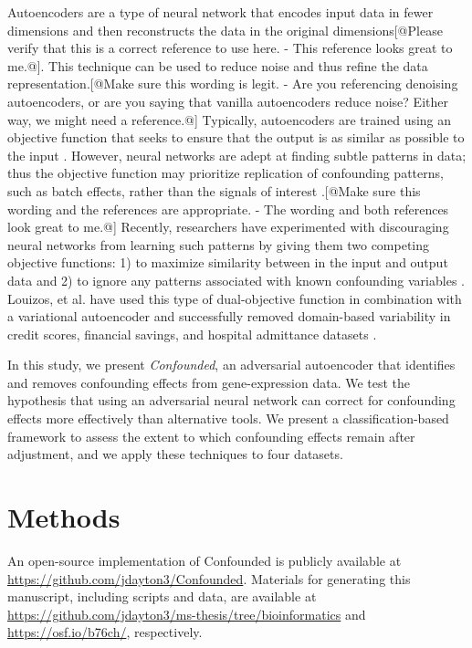 \documentclass[11pt]{article}
\begin{document}
Autoencoders are a type of neural network that encodes input data in fewer dimensions and then reconstructs the data in the original dimensions\citep{hinton_reducing_2006}[@Please verify that this is a correct reference to use here. - This reference looks great to me.@].
This technique can be used to reduce noise and thus refine the data representation.[@Make sure this wording is legit. - Are you referencing denoising autoencoders, or are you saying that vanilla autoencoders reduce noise? Either way, we might need a reference.@]
Typically, autoencoders are trained using an objective function that seeks to ensure that the output is as similar as possible to the input \citep{hinton_reducing_2006}.
However, neural networks are adept at finding subtle patterns in data; thus the objective function may prioritize replication of confounding patterns, such as batch effects, rather than the signals of interest \citep{ganin_domain-adversarial_2015,louizos_causal_2017-2}.[@Make sure this wording and the references are appropriate. - The wording and both references look great to me.@]
Recently, researchers have experimented with discouraging neural networks from learning such patterns by giving them two competing objective functions: 1) to maximize similarity between in the input and output data and 2) to ignore any patterns associated with known confounding variables \citep{ganin_domain-adversarial_2015,tzeng_deep_2014-2}.
Louizos, et al. have used this type of dual-objective function in combination with a variational autoencoder and successfully removed domain-based variability in credit scores, financial savings, and hospital admittance datasets \citet{louizos_variational_2015}.

In this study, we present \textit{Confounded}, an adversarial autoencoder that identifies and removes confounding effects from gene-expression data.
We test the hypothesis that using an adversarial neural network can correct for confounding effects more effectively than alternative tools.
We present a classification-based framework to assess the extent to which confounding effects remain after adjustment, and we apply these techniques to four datasets.

\section{Methods} \label{sec:methods}

An open-source implementation of Confounded is publicly available at \url{https://github.com/jdayton3/Confounded}. Materials for generating this manuscript, including scripts and data, are available at \url{https://github.com/jdayton3/ms-thesis/tree/bioinformatics} and \url{https://osf.io/b76ch/}, respectively.
\end{document}

